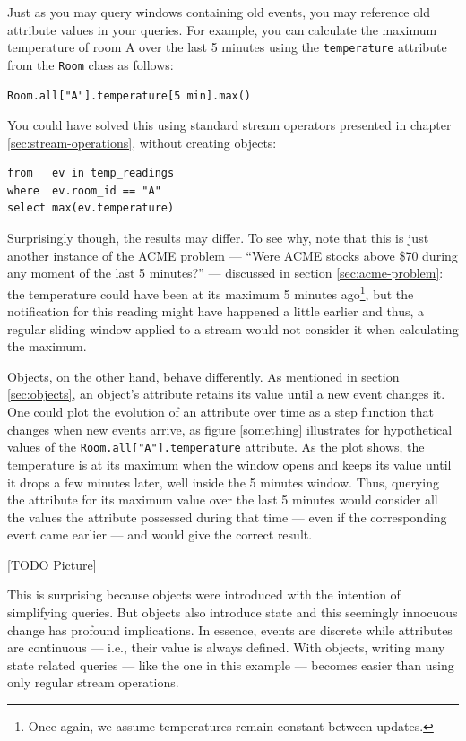 \documentclass{report}
\begin{document}
Just as you may query windows containing old events, you may reference
old attribute values in your queries. For example, you can calculate
the maximum temperature of room A over the last 5 minutes using the
\verb=temperature= attribute from the \verb=Room= class as follows:

\begin{verbatim}
Room.all["A"].temperature[5 min].max()
\end{verbatim}

You could have solved this using standard stream operators presented
in chapter \ref{sec:stream-operations}, without creating objects:

\begin{verbatim}
from   ev in temp_readings
where  ev.room_id == "A"
select max(ev.temperature)
\end{verbatim}

Surprisingly though, the results may differ. To see why, note that
this is just another instance of the ACME problem --- ``Were ACME
stocks above \$70 during any moment of the last 5 minutes?'' ---
discussed in section \ref{sec:acme-problem}: the temperature could have
been at its maximum 5 minutes ago\footnote{Once again, we assume
  temperatures remain constant between updates.}, but the notification
for this reading might have happened a little earlier and thus, a
regular sliding window applied to a stream would not consider it when
calculating the maximum.

Objects, on the other hand, behave differently. As mentioned in
section \ref{sec:objects}, an object's attribute retains its value
until a new event changes it. One could plot the evolution of an
attribute over time as a step function that changes when new events
arrive, as figure [something] illustrates for hypothetical values of
the \verb=Room.all["A"].temperature= attribute. As the plot shows, the
temperature is at its maximum when the window opens and keeps its
value until it drops a few minutes later, well inside the 5 minutes
window. Thus, querying the attribute for its maximum value over the
last 5 minutes would consider all the values the attribute possessed
during that time --- even if the corresponding event came earlier ---
and would give the correct result.

[TODO Picture]

This is surprising because objects were introduced with the intention
of simplifying queries. But objects also introduce state and this
seemingly innocuous change has profound implications. In essence,
events are discrete while attributes are continuous --- i.e., their
value is always defined. With objects, writing many state related
queries --- like the one in this example --- becomes easier than using
only regular stream operations.
\end{document}
